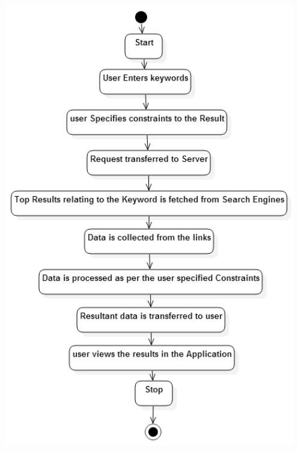 \documentclass[a4paper]{report}
\begin{document}
\center
\includegraphics[width = 5in]{SearchActivity.png}  
\newpage
\end{document}
